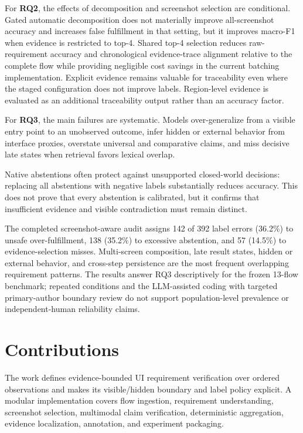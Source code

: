 For \textbf{RQ2}, the effects of decomposition and screenshot selection are
conditional. Gated automatic decomposition does not materially improve
all-screenshot accuracy and increases false fulfillment in that setting, but it
improves macro-F1 when evidence is restricted to top-4. Shared top-4 selection
reduces raw-requirement accuracy and chronological evidence-trace alignment relative to the complete flow
while providing negligible cost savings in the current batching
implementation. Explicit evidence remains valuable for traceability even where
the staged configuration does not improve labels. Region-level evidence is
evaluated as an additional traceability output rather than an accuracy factor.

For \textbf{RQ3}, the main failures are systematic. Models over-generalize from a
visible entry point to an unobserved outcome, infer hidden or external behavior
from interface proxies, overstate universal and comparative claims, and miss
decisive late states when retrieval favors lexical overlap.

Native abstentions often protect against unsupported closed-world decisions:
replacing all abstentions with negative labels substantially reduces accuracy.
This does not prove that every abstention is calibrated, but it confirms that
insufficient evidence and visible contradiction must remain distinct.

The completed
screenshot-aware audit assigns 142 of 392 label errors (36.2\%) to unsafe
over-fulfillment, 138 (35.2\%) to excessive abstention, and 57 (14.5\%) to
evidence-selection misses. Multi-screen composition, late result states, hidden
or external behavior, and cross-step persistence are the most frequent
overlapping requirement patterns. The results answer RQ3 descriptively for the
frozen 13-flow benchmark; repeated conditions and the LLM-assisted coding with
targeted primary-author boundary review do not support population-level
prevalence or independent-human reliability claims.

\section{Contributions}\label{contributions}

The work defines evidence-bounded UI requirement verification over ordered
observations and makes its visible/hidden boundary and label policy explicit. A
modular implementation covers flow ingestion, requirement understanding,
screenshot selection, multimodal claim verification, deterministic
aggregation, evidence localization, annotation, and experiment packaging.


